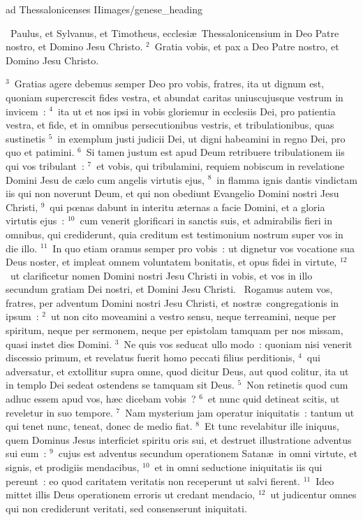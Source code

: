{ad Thessalonicenses II}{images/genese_heading}

~\lettrine[lines=10,image=true,loversize=0.05,lraise=-0.03]{P}{}aulus, et Sylvanus, et Timotheus, ecclesi\ae\ Thessalonicensium in Deo Patre nostro, et Domino Jesu Christo.
${}^{2}$~Gratia vobis, et pax a Deo Patre nostro, et Domino Jesu Christo.


${}^{3}$~Gratias agere debemus semper Deo pro vobis, fratres, ita ut dignum est, quoniam supercrescit fides vestra, et abundat caritas uniuscujusque vestrum in invicem~:
${}^{4}$~ita ut et nos ipsi in vobis gloriemur in ecclesiis Dei, pro patientia vestra, et fide, et in omnibus persecutionibus vestris, et tribulationibus, quas sustinetis
${}^{5}$~in exemplum justi judicii Dei, ut digni habeamini in regno Dei, pro quo et patimini.
${}^{6}$~Si tamen justum est apud Deum retribuere tribulationem iis qui vos tribulant~:
${}^{7}$~et vobis, qui tribulamini, requiem nobiscum in revelatione Domini Jesu de c\ae lo cum angelis virtutis ejus,
${}^{8}$~in flamma ignis dantis vindictam iis qui non noverunt Deum, et qui non obediunt Evangelio Domini nostri Jesu Christi,
${}^{9}$~qui pœnas dabunt in interitu \ae ternas a facie Domini, et a gloria virtutis ejus~:
${}^{10}$~cum venerit glorificari in sanctis suis, et admirabilis fieri in omnibus, qui crediderunt, quia creditum est testimonium nostrum super vos in die illo.
${}^{11}$~In quo etiam oramus semper pro vobis~: ut dignetur vos vocatione sua Deus noster, et impleat omnem voluntatem bonitatis, et opus fidei in virtute,
${}^{12}$~ut clarificetur nomen Domini nostri Jesu Christi in vobis, et vos in illo secundum gratiam Dei nostri, et Domini Jesu Christi.
~\lettrine[lines=10,image=true,loversize=0.05,lraise=-0.03]{R}{}ogamus autem vos, fratres, per adventum Domini nostri Jesu Christi, et nostr\ae\ congregationis in ipsum~:
${}^{2}$~ut non cito moveamini a vestro sensu, neque terreamini, neque per spiritum, neque per sermonem, neque per epistolam tamquam per nos missam, quasi instet dies Domini.
${}^{3}$~Ne quis vos seducat ullo modo~: quoniam nisi venerit discessio primum, et revelatus fuerit homo peccati filius perditionis,
${}^{4}$~qui adversatur, et extollitur supra omne, quod dicitur Deus, aut quod colitur, ita ut in templo Dei sedeat ostendens se tamquam sit Deus.
${}^{5}$~Non retinetis quod cum adhuc essem apud vos, h\ae c dicebam vobis~?
${}^{6}$~et nunc quid detineat scitis, ut reveletur in suo tempore.
${}^{7}$~Nam mysterium jam operatur iniquitatis~: tantum ut qui tenet nunc, teneat, donec de medio fiat.
${}^{8}$~Et tunc revelabitur ille iniquus, quem Dominus Jesus interficiet spiritu oris sui, et destruet illustratione adventus sui eum~:
${}^{9}$~cujus est adventus secundum operationem Satan\ae\ in omni virtute, et signis, et prodigiis mendacibus,
${}^{10}$~et in omni seductione iniquitatis iis qui pereunt~: eo quod caritatem veritatis non receperunt ut salvi fierent.
${}^{11}$~Ideo mittet illis Deus operationem erroris ut credant mendacio,
${}^{12}$~ut judicentur omnes qui non crediderunt veritati, sed consenserunt iniquitati.


